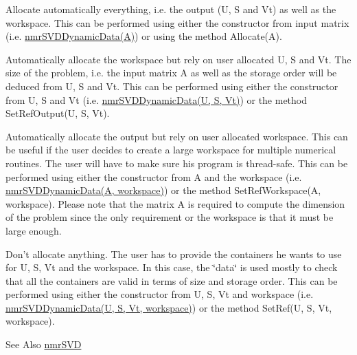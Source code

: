 \begin{DoxyItemize}
\item Allocate automatically everything, i.\-e. the output (U, S and Vt) as well as the workspace. This can be performed using either the constructor from input matrix (i.\-e. \hyperlink{classnmr_s_v_d_dynamic_data}{nmr\-S\-V\-D\-Dynamic\-Data(\-A)}) or using the method Allocate(\-A).
\item Automatically allocate the workspace but rely on user allocated U, S and Vt. The size of the problem, i.\-e. the input matrix A as well as the storage order will be deduced from U, S and Vt. This can be performed using either the constructor from U, S and Vt (i.\-e. \hyperlink{classnmr_s_v_d_dynamic_data}{nmr\-S\-V\-D\-Dynamic\-Data(\-U, S, Vt)}) or the method Set\-Ref\-Output(\-U, S, Vt).
\item Automatically allocate the output but rely on user allocated workspace. This can be useful if the user decides to create a large workspace for multiple numerical routines. The user will have to make sure his program is thread-\/safe. This can be performed using either the constructor from A and the workspace (i.\-e. \hyperlink{classnmr_s_v_d_dynamic_data}{nmr\-S\-V\-D\-Dynamic\-Data(\-A, workspace)}) or the method Set\-Ref\-Workspace(\-A, workspace). Please note that the matrix A is required to compute the dimension of the problem since the only requirement or the workspace is that it must be large enough.
\item Don't allocate anything. The user has to provide the containers he wants to use for U, S, Vt and the workspace. In this case, the \char`\"{}data\char`\"{} is used mostly to check that all the containers are valid in terms of size and storage order. This can be performed using either the constructor from U, S, Vt and workspace (i.\-e. \hyperlink{classnmr_s_v_d_dynamic_data}{nmr\-S\-V\-D\-Dynamic\-Data(\-U, S, Vt, workspace)}) or the method Set\-Ref(\-U, S, Vt, workspace).
\end{DoxyItemize}

\begin{DoxySeeAlso}{See Also}
\hyperlink{nmr_s_v_d_8h_a52115d0e7a485c4494aa20f4f3f4ebe7}{nmr\-S\-V\-D} 
\end{DoxySeeAlso}


